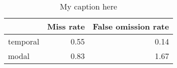 \begin{table}[!ht]
\centering
\begin{tabular}{lrr}
\toprule
{} &  Miss rate &  False omission rate \\
\midrule
temporal &       0.55 &                 0.14 \\
modal    &       0.83 &                 1.67 \\
\bottomrule
\end{tabular}
\caption{My caption here}
\label{tab:DEICTICITY-ocd-combined-errors}
\end{table}